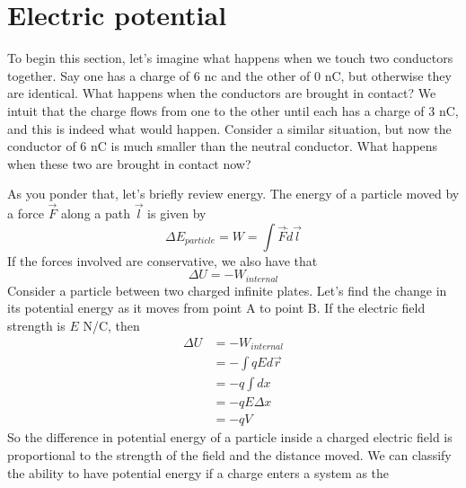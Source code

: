 \documentclass[nobib]{tufte-handout}
\begin{document}
\section{Electric potential} 
To begin this section, let's imagine what happens when we touch two 
conductors together. Say one has a charge of 6 nc and the other of 0 nC, 
but otherwise they are identical. What happens when the conductors are brought 
in contact? We intuit that the charge flows from one to the other 
until each has a charge of 3 nC, and this is indeed what would happen. 
Consider a similar situation, but now the conductor of 6 nC is 
much smaller than the neutral conductor. What happens when these two 
are brought in contact now?

As you ponder that, let's briefly review energy. The energy of 
a particle moved by a force $\vec{F}$ along a path $\vec{l}$ is given by 
\[\Delta E_{particle} = W = \int \vec{F} \dot d\vec{l}\]
If the forces involved are conservative, we also have that 
\[\Delta U = -W_{internal}\]
Consider a particle between two charged infinite plates. Let's find the change in its potential energy
as it moves from point A to point B. If the electric field strength is $E$ N/C, 
then 
\begin{align*}
    \Delta U &= -W_{internal} \\
    &= -\int qE d\vec{r} \\
    &= -q\int dx \\
    &= -qE\Delta x \\
    &= -qV
\end{align*}
So the difference in potential energy of a particle inside a charged 
electric field is proportional to the strength of the field and the distance
moved. We can classify the ability to have potential energy 
if a charge enters a system as the
\end{document}
